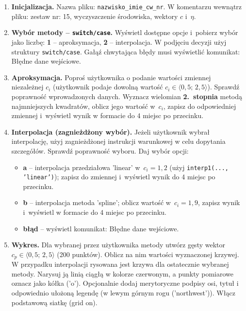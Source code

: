 \documentclass[a4paper,11pt]{article}
\begin{document}
\begin{enumerate}[leftmargin=*, label=\textbf{\arabic*.}, itemsep=2pt]

  \item \textbf{Inicjalizacja.}
    Nazwa pliku: \texttt{nazwisko\_imie\_cw\_nr}. W komentarzu wewnątrz pliku: zestaw nr: 15, wyczyszczenie środowiska, wektory $c$ i~$\eta$.

  \item \textbf{Wybór metody -- \texttt{switch/case}.}
    Wyświetl dostępne opcje i~pobierz wybór jako liczbę: \textbf{1} -- aproksymacja, \textbf{2} -- interpolacja. W podjęciu decyzji użyj struktury \texttt{switch/case}. Gałąź chwytająca błędy musi wyświetlić komunikat: Błędne dane wejściowe.

  \item \textbf{Aproksymacja.}
    Poproś użytkownika o podanie wartości zmiennej niezależnej $c_i$ (użytkownik podaje dowolną wartość $c_i \in \langle 0{,}5;\,2{,}5 \rangle$). Sprawdź poprawność wprowadzonych danych. Wyznacz wielomian \textbf{2.~stopnia} metodą najmniejszych kwadratów, oblicz jego wartość w~$c_i$, zapisz do odpowiedniej zmiennej i~wyświetl wynik w formacie do 4 miejsc po przecinku.

  \item \textbf{Interpolacja (zagnieżdżony wybór).}
    Jeżeli użytkownik wybrał interpolację, użyj zagnieżdżonej instrukcji warunkowej w celu dopytania szczegółów. Sprawdź poprawność wyboru. Daj wybór opcji:
    \begin{itemize}[itemsep=1pt]
      \item \textbf{a} -- interpolacja przedziałowa 'linear' w~$c_i = 1{,}2$ (użyj \texttt{interp1(..., 'linear')}); zapisz do zmiennej i~wyświetl wynik do 4 miejsc po przecinku.
      \item \textbf{b} -- interpolacja metoda 'spline'; oblicz wartość w~$c_i = 1{,}9$, zapisz wynik i~wyświetl w formacie do 4 miejsc po przecinku.
      \item \textbf{błąd} -- wyświetl komunikat: Błędne dane wejściowe.
    \end{itemize}

  \item \textbf{Wykres.}
    Dla wybranej przez użytkownika metody utwórz gęsty wektor $c_p \in \langle 0{,}5;\,2{,}5 \rangle$ (200 punktów). Oblicz na nim wartości wyznaczonej krzywej. W przypadku interpolacji rysowana jest krzywa dla ostatecznie wybranej metody. Narysuj ją linią ciągłą w kolorze czerwonym, a punkty pomiarowe oznacz jako kółka ('o'). Opcjonalnie dodaj merytoryczne podpisy osi, tytuł i odpowiednio ułożoną legendę (w lewym górnym rogu ('northwest')). Włącz podstawową siatkę (grid on).

\end{enumerate}
\end{document}
